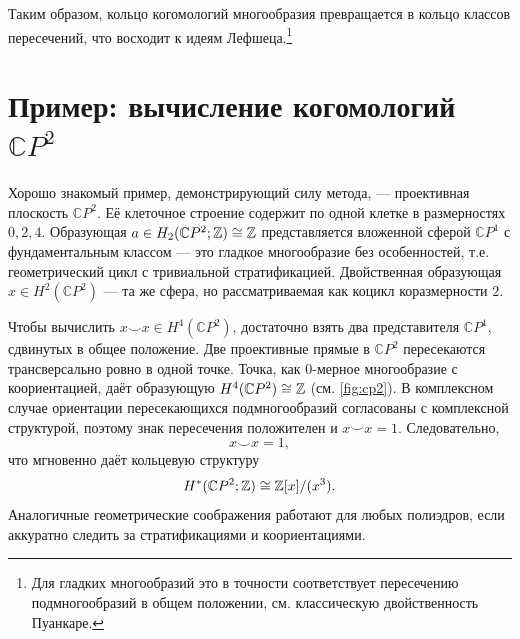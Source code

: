 \documentclass[12pt, twoside]{article}
\begin{document}
Таким образом, кольцо когомологий многообразия превращается в кольцо классов пересечений, что восходит к идеям Лефшеца.\footnote{Для гладких многообразий это в точности соответствует пересечению подмногообразий в общем положении, см. классическую двойственность Пуанкаре.}

\section[Пример: вычисление когомологий CP2]{Пример: вычисление когомологий $\mathbb{C}P^2$}

Хорошо знакомый пример, демонстрирующий силу метода, --- проективная плоскость $\mathbb{C}P^2$. Её клеточное строение содержит по одной клетке в размерностях $0,2,4$. Образующая $a \in H_2(\mathbb{C}P^2;\mathbb Z) \cong \mathbb Z$ представляется вложенной сферой $\mathbb{C}P^1$ с фундаментальным классом --- это гладкое многообразие без особенностей, т.е. геометрический цикл с тривиальной стратификацией. Двойственная образующая $x \in H^2(\mathbb{C}P^2)$ --- та же сфера, но рассматриваемая как коцикл коразмерности $2$.

Чтобы вычислить $x \smile x \in H^4(\mathbb{C}P^2)$, достаточно взять два представителя $\mathbb{C}P^1$, сдвинутых в общее положение. Две проективные прямые в $\mathbb{C}P^2$ пересекаются трансверсально ровно в одной точке. Точка, как $0$-мерное многообразие с коориентацией, даёт образующую $H^4(\mathbb{C}P^2) \cong \mathbb Z$ (см. \cref{fig:cp2}). В комплексном случае ориентации пересекающихся подмногообразий согласованы с комплексной структурой, поэтому знак пересечения положителен и $x \smile x = 1$. Следовательно,
\begin{equation}
x \smile x = 1,
\end{equation}
что мгновенно даёт кольцевую структуру
\begin{equation}
H^*(\mathbb{C}P^2;\mathbb Z) \cong \mathbb Z[x]/(x^3).
\end{equation}
Аналогичные геометрические соображения работают для любых полиэдров, если аккуратно следить за стратификациями и коориентациями.\footnotemark
{}
\end{document}
